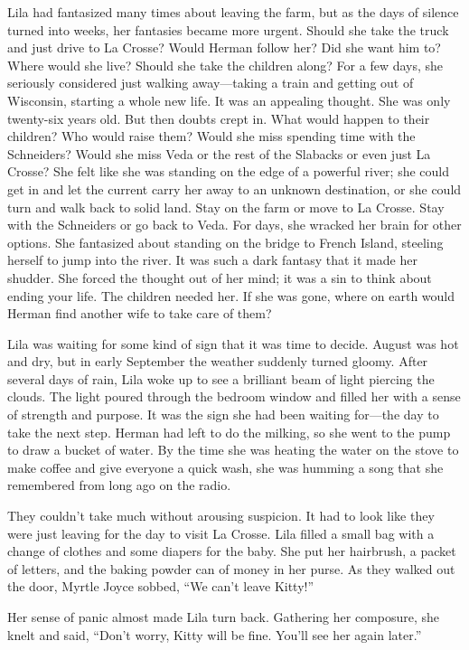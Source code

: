 \documentclass[
  letterpaper,
]{book}
\begin{document}
Lila had fantasized many times about leaving the farm, but as the days
of silence turned into weeks, her fantasies became more urgent. Should
she take the truck and just drive to La Crosse? Would Herman follow her?
Did she want him to? Where would she live? Should she take the children
along? For a few days, she seriously considered just walking
away---taking a train and getting out of Wisconsin, starting a whole new
life. It was an appealing thought. She was only twenty-six years old.
But then doubts crept in. What would happen to their children? Who would
raise them? Would she miss spending time with the Schneiders? Would she
miss Veda or the rest of the Slabacks or even just La Crosse? She felt
like she was standing on the edge of a powerful river; she could get in
and let the current carry her away to an unknown destination, or she
could turn and walk back to solid land. Stay on the farm or move to La
Crosse. Stay with the Schneiders or go back to Veda. For days, she
wracked her brain for other options. She fantasized about standing on
the bridge to French Island, steeling herself to jump into the river. It
was such a dark fantasy that it made her shudder. She forced the thought
out of her mind; it was a sin to think about ending your life. The
children needed her. If she was gone, where on earth would Herman find
another wife to take care of them?

Lila was waiting for some kind of sign that it was time to decide.
August was hot and dry, but in early September the weather suddenly
turned gloomy. After several days of rain, Lila woke up to see a
brilliant beam of light piercing the clouds. The light poured through
the bedroom window and filled her with a sense of strength and purpose.
It was the sign she had been waiting for---the day to take the next
step. Herman had left to do the milking, so she went to the pump to draw
a bucket of water. By the time she was heating the water on the stove to
make coffee and give everyone a quick wash, she was humming a song that
she remembered from long ago on the radio.

They couldn't take much without arousing suspicion. It had to look like
they were just leaving for the day to visit La Crosse. Lila filled a
small bag with a change of clothes and some diapers for the baby. She
put her hairbrush, a packet of letters, and the baking powder can of
money in her purse. As they walked out the door, Myrtle Joyce sobbed,
``We can't leave Kitty!''

Her sense of panic almost made Lila turn back. Gathering her composure,
she knelt and said, ``Don't worry, Kitty will be fine. You'll see her
again later.''
\end{document}
